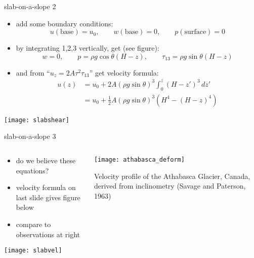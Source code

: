 \begin{frame}{slab-on-a-slope 2}

\begin{itemize}
\item add some boundary conditions:
	$$u(\text{base})=u_0, \qquad w(\text{base})=0, \qquad p(\text{surface})=0$$
\item by integrating 1,2,3 vertically, get (see figure):
  $$w=0, \qquad p = \rho g \cos\theta (H-z), \qquad \tau_{13} = \rho g \sin\theta (H-z)$$
\item and from ``$u_z = 2 A \tau^2 \tau_{13}$'' get \alert{velocity formula}:
\vspace{-0.05in}
\begin{align*}
u(z) &= u_0 + 2 A (\rho g \sin\theta)^3 \int_0^z (H-z')^3\,dz' \\
     &= u_0 + \frac{1}{2} A (\rho g \sin\theta)^3  \left(H^4 - (H-z)^4\right)
\end{align*}
\end{itemize}

\vspace{-5mm}
\texttt{[image: slabshear]}
\end{frame}


\begin{frame}{slab-on-a-slope 3}

\begin{columns}
\begin{column}{0.6\textwidth}
\begin{itemize}
\item do we believe these equations?
\item velocity formula on last slide gives figure below
\item compare to observations at right
\end{itemize}
\begin{center}
\texttt{[image: slabvel]}
\end{center}
\end{column}

\begin{column}{0.4\textwidth}
\texttt{[image: athabasca\_deform]}

\medskip
\scriptsize
Velocity profile of the Athabasca Glacier, Canada, derived from inclinometry (Savage and Paterson, 1963)\nocite{SavagePaterson}
\end{column}
\end{columns}
\end{frame}


